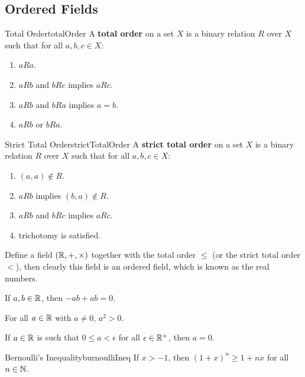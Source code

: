 \documentclass[math]{amznotes}
\theoremstyle{remark}
\begin{document}
\subsection{Ordered Fields}
\begin{dfnbox}{Total Order}{totalOrder}
    A {\color{red} \textbf{total order}} on a set $X$ is a binary relation $R$ over $X$ such that for all $a, b, c \in X$:
    \begin{enumerate}
        \item $aRa$.
        \item $aRb$ and $bRc$ implies $aRc$.
        \item $aRb$ and $bRa$ implies $a = b$.
        \item $aRb$ or $bRa$.
    \end{enumerate}
\end{dfnbox}
\begin{dfnbox}{Strict Total Order}{strictTotalOrder}
    A {\color{red} \textbf{strict total order}} on a set $X$ is a binary relation $R$ over $X$ such that for all $a, b, c \in X$:
    \begin{enumerate}
        \item $(a, a) \notin R$.
        \item $aRb$ implies $(b, a) \notin R$.
        \item $aRb$ and $bRc$ implies $aRc$.
        \item trichotomy is satisfied.
    \end{enumerate}
\end{dfnbox}
Define a field $(\mathbb{R}, +, \times)$ together with the total order $\leq$ (or the strict total order $<$), then clearly this field is an ordered field, which is known as the real numbers.
\begin{thmbox}{}{}
    If $a, b \in \mathbb{R}$, then $-ab + ab = 0$. 
\end{thmbox}
\begin{thmbox}{}{}
    For all $a \in \mathbb{R}$ with $a \neq 0$, $a^2 > 0$.
\end{thmbox}
\begin{thmbox}{}{}
    If $a \in \mathbb{R}$ is such that $0 \leq a < \epsilon$ for all $\epsilon \in \mathbb{R}^+$, then $a = 0$.
\end{thmbox}
\begin{thmbox}{Bernoulli's Inequality}{burnoulliIneq}
    If $x > -1$, then $(1 + x)^n \geq 1 + nx$ for all $n \in \mathbb{N}$.
\end{thmbox}
\end{document}
